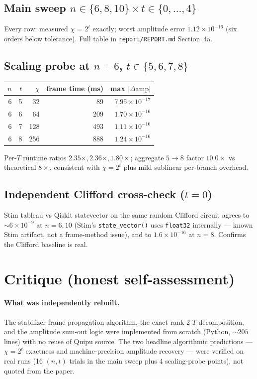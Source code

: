 \documentclass[11pt]{article}
\begin{document}
\subsection{Main sweep $n\in\{6,8,10\}\times t\in\{0,\ldots,4\}$}
Every row: measured $\chi$ = $2^t$ exactly; worst amplitude error $1.12\times 10^{-16}$
(six orders below tolerance). Full table in \texttt{report/REPORT.md} Section~4a.

\subsection{Scaling probe at $n=6$, $t\in\{5,6,7,8\}$}
\begin{center}\begin{tabular}{rrrrr}
\toprule
$n$ & $t$ & $\chi$ & frame time (ms) & max $|\Delta\text{amp}|$ \\
\midrule
6 & 5 & 32  & 89  & $7.95\times 10^{-17}$ \\
6 & 6 & 64  & 209 & $1.70\times 10^{-16}$ \\
6 & 7 & 128 & 493 & $1.11\times 10^{-16}$ \\
6 & 8 & 256 & 888 & $1.24\times 10^{-16}$ \\
\bottomrule
\end{tabular}\end{center}
Per-$T$ runtime ratios $2.35\times, 2.36\times, 1.80\times$; aggregate $5\to8$
factor $10.0\times$ vs theoretical $8\times$, consistent with $\chi=2^t$ plus mild
sublinear per-branch overhead.

\subsection{Independent Clifford cross-check ($t=0$)}
Stim tableau vs Qiskit statevector on the same random Clifford circuit agrees to
$\sim 6\times 10^{-9}$ at $n=6,10$ (Stim's \texttt{state\_vector()} uses \texttt{float32}
internally --- known Stim artifact, not a frame-method issue), and to
$1.6\times 10^{-16}$ at $n=8$. Confirms the Clifford baseline is real.

\section{Critique (honest self-assessment)}
\paragraph{What was independently rebuilt.}
The stabilizer-frame propagation algorithm, the exact rank-2 $T$-decomposition,
and the amplitude sum-out logic were implemented from scratch (Python, ${\sim}205$
lines) with no reuse of Quipu source. The two headline algorithmic
predictions --- $\chi = 2^t$ exactness and machine-precision amplitude
recovery --- were verified on real runs (16 $(n,t)$ trials in the main sweep
plus 4 scaling-probe points), not quoted from the paper.
\end{document}
